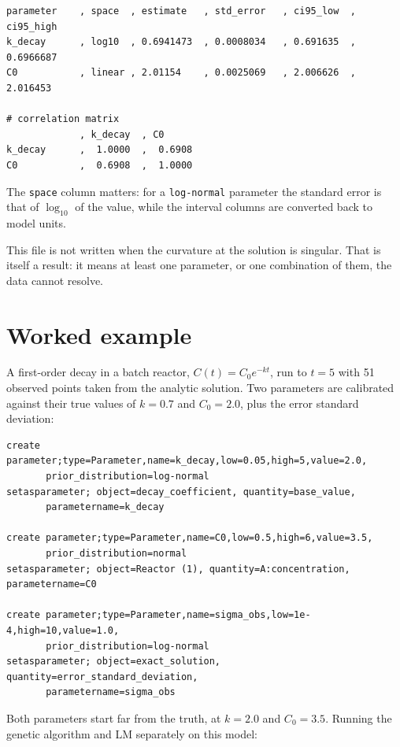 \documentclass[11pt,a4paper]{article}
\newcommand{\code}[1]{\texttt{\small #1}}
\begin{document}
\begin{lstlisting}
parameter    , space  , estimate   , std_error   , ci95_low  , ci95_high
k_decay      , log10  , 0.6941473  , 0.0008034   , 0.691635  , 0.6966687
C0           , linear , 2.01154    , 0.0025069   , 2.006626  , 2.016453

# correlation matrix
             , k_decay  , C0
k_decay      ,  1.0000  ,  0.6908
C0           ,  0.6908  ,  1.0000
\end{lstlisting}

The \code{space} column matters: for a \code{log-normal} parameter the standard
error is that of $\log_{10}$ of the value, while the interval columns are
converted back to model units.

This file is not written when the curvature at the solution is singular. That is
itself a result: it means at least one parameter, or one combination of them,
the data cannot resolve.

\section{Worked example}

A first-order decay in a batch reactor, $C(t) = C_0 e^{-kt}$, run to $t=5$ with
51 observed points taken from the analytic solution. Two parameters are
calibrated against their true values of $k=0.7$ and $C_0=2.0$, plus the error
standard deviation:

\begin{lstlisting}
create parameter;type=Parameter,name=k_decay,low=0.05,high=5,value=2.0,
       prior_distribution=log-normal
setasparameter; object=decay_coefficient, quantity=base_value,
       parametername=k_decay

create parameter;type=Parameter,name=C0,low=0.5,high=6,value=3.5,
       prior_distribution=normal
setasparameter; object=Reactor (1), quantity=A:concentration, parametername=C0

create parameter;type=Parameter,name=sigma_obs,low=1e-4,high=10,value=1.0,
       prior_distribution=log-normal
setasparameter; object=exact_solution, quantity=error_standard_deviation,
       parametername=sigma_obs
\end{lstlisting}

\noindent Both parameters start far from the truth, at $k=2.0$ and $C_0=3.5$.
Running the genetic algorithm and LM separately on this model:
\end{document}
